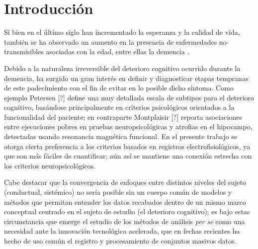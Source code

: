 
\chapter{Introducción}

Si bien en el último siglo han incrementado la esperanza y la calidad de vida, también se ha 
observado un aumento en la presencia de enfermedades no-transmisibles asociadas con 
la edad, entre ellas la demencia \cite{PlanAlzheimer04}.

Debido a la naturaleza irreversible del deterioro cognitivo ocurrido durante la demencia, 
ha surgido un gran interés en definir y diagnosticar etapas tempranas de este padecimiento con el 
fin de evitar en lo posible dicho síntoma.
%
Como ejemplo Petersen [?]
define una muy detallada escala de subtipos para el deterioro cognitivo, basándose principalmente
en criterios psicológicos orientados a la funcionalidad del paciente;
%
en contraparte Montplaisir [?] reporta asociaciones entre ejecuciones pobres en pruebas
neuropsicológicas y atrofias en el hipocampo, detectadas usando resonancia magnética funcional.
En el presente trabajo se otorga cierta preferencia a los criterios basados en registros 
electrofisiológicos, ya que son más fáciles de cuantificar; aún así se mantiene una conexión 
estrecha con los criterios neuropsicológicos.

Cabe destacar que 
la convergencia de enfoques entre distintos niveles del sujeto (conductual, sistémico) no sería
posible sin un cuerpo común de modelos y métodos que permitan entender los datos recabados dentro
de un mismo marco conceptual centrado en el sujeto de estudio (el deterioro cognitivo);
es bajo estas circunstancia que emerge el estudio de los métodos de análisis \textit{per se}
como una necesidad ante la innovación tecnológica acelerada, que en fechas recientes ha hecho
de uso común el registro y procesamiento de conjuntos masivos datos.

